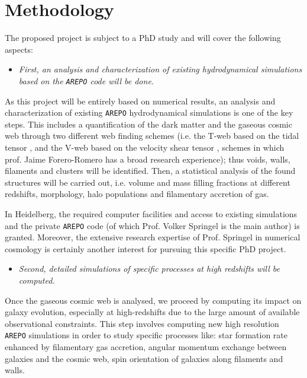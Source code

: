 \documentclass[a4,useAMS,usenatbib,usegraphicx,12pt]{article}
\begin{document}
\section{Methodology}


The proposed project is subject to a PhD study and will cover the following 
aspects:


\begin{itemize}

\item[\checkmark] \textit{First, an analysis and characterization of existing 
hydrodynamical simulations based on the \texttt{AREPO} code will be done.}

\end{itemize}


As this project will be entirely based on numerical results, an analysis and 
characterization of existing \texttt{AREPO} hydrodynamical simulations is one 
of the key steps. This includes a quantification of the dark matter and the 
gaseous cosmic web through two different web finding schemes (i.e. the T-web 
based on the tidal tensor \citep{Hahn07,Forero09}, and the V-web based on the 
velocity shear tensor \citep{Hoffman12}, schemes in which prof. Jaime 
Forero-Romero has a broad research experience); thus voids, walls, filaments 
and clusters will be identified. Then, a statistical analysis of the found 
structures will be carried out, i.e. volume and mass filling fractions at 
different redshifts, morphology, halo populations and filamentary accretion of 
gas.


In Heidelberg, the required computer facilities and access to existing 
simulations and the private \texttt{AREPO} code (of which Prof. Volker 
Springel is the main author) is granted. Moreover, the extensive research 
expertise of Prof. Springel in numerical cosmology is 
certainly another interest for pursuing this specific PhD project.


\begin{itemize}

\item[\checkmark] \textit{Second, detailed simulations of specific processes at
high redshifts will be computed.}

\end{itemize}


Once the gaseous cosmic web is analysed, we proceed by computing its impact on 
galaxy evolution, especially at high-redshifts due to the large amount of 
available observational constraints. This step involves computing new high 
resolution \texttt{AREPO} simulations in order to study specific processes 
like: star formation rate enhanced by filamentary gas accretion, angular 
momentum exchange between galaxies and the cosmic web, spin orientation of 
galaxies along filaments and walls.
\end{document}
